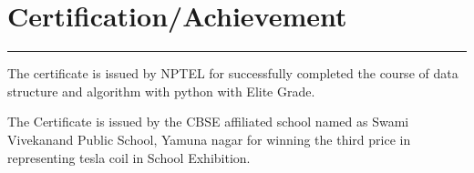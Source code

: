 \documentclass[]{vishal-kathpalia}
\begin{document}
\begin{minipage}[t]{0.66\textwidth}
\section{Certification/Achievement}
\noindent\rule{12.5cm}{0.4pt}
\datecolor{} 
\noindent
\hspace{0em}%
\begin{minipage}{0.95\textwidth\vspace{5pt}}
The certificate is issued by NPTEL for successfully completed the course of data structure and algorithm with python with Elite Grade. 
\end{minipage}
\datecolor{} 
\noindent
\hspace{0em}%
\begin{minipage}{0.95\textwidth\vspace{5pt}}
The Certificate is issued by the CBSE affiliated school named as Swami Vivekanand Public School, Yamuna nagar for winning the third price in representing tesla coil in School Exhibition.
\end{minipage}
\end{minipage} 
\end{document}
